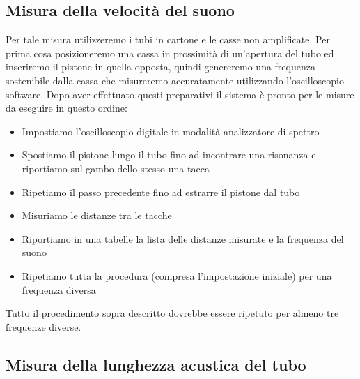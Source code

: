 \documentclass[a4paper,10pt,oneside]{article}
\begin{document}
\subsection*{Misura della velocità del suono}
Per tale misura utilizzeremo i tubi in cartone e le casse non amplificate. Per prima cosa posizioneremo una cassa in prossimità di un'apertura del tubo ed inseriremo il pistone in quella opposta, quindi genereremo una frequenza sostenibile dalla cassa che misureremo accuratamente utilizzando l'oscilloscopio software. Dopo aver effettuato questi preparativi il sistema è pronto per le misure da eseguire in questo ordine:
\begin{itemize}
 \item Impostiamo l'oscilloscopio digitale in modalità analizzatore di spettro
 \item Spostiamo il pistone lungo il tubo fino ad incontrare una risonanza e riportiamo sul gambo dello stesso una tacca
 \item Ripetiamo il passo precedente fino ad estrarre il pistone dal tubo
 \item Misuriamo le distanze tra le tacche 
 \item Riportiamo in una tabelle la lista delle distanze misurate e la frequenza del suono
\item Ripetiamo tutta la procedura (compresa l'impostazione iniziale) per una frequenza diversa
\end{itemize}
Tutto il procedimento sopra descritto dovrebbe essere ripetuto per almeno tre frequenze diverse.

\subsection*{Misura della lunghezza acustica del tubo}
\end{document}
